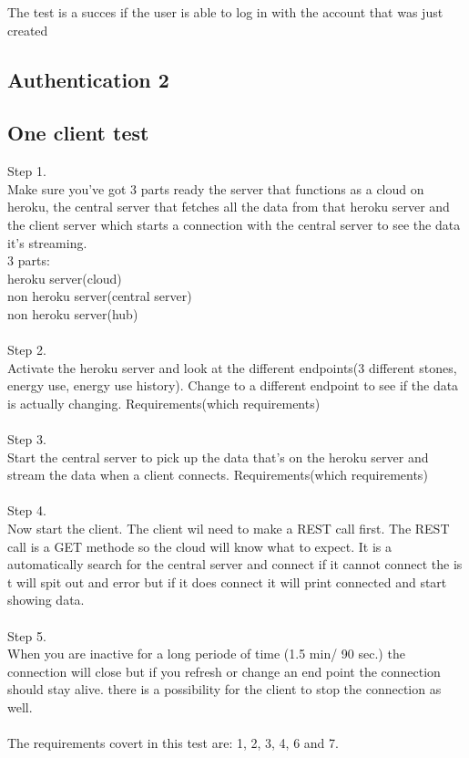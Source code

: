 \documentclass{article}
\begin{document}
The test is a succes if the user is able to log in with the account that was just created
\subsection{Authentication 2}\label{authentication2}


\subsection{One client test}\label{client test}
Step 1. \\
Make sure you've got 3 parts ready the server that functions as a cloud on heroku, the central server that fetches all the data from that heroku server and the client server which starts a connection with the central server to see the data it's streaming. \\
3 parts: \\
heroku server(cloud)\\
non heroku server(central server)\\
non heroku server(hub)\\
\\
Step 2.\\
Activate the heroku server and look at the different endpoints(3 different stones, energy use, energy use history). Change to a different endpoint to see if the data is actually changing. Requirements(which requirements)\\
\\
Step 3.\\
Start the central server to pick up the data that's on the heroku server and stream the data when a client connects. Requirements(which requirements)\\
\\
Step 4. \\
Now start the client. The client wil need to make a REST call first. The REST call is a GET methode so the cloud will know what to expect. It is a automatically search for the central server and connect if it cannot connect the is t will spit out and error but if it does connect it will print connected and start showing data.\\
\\
Step 5. \\
When you are inactive for a long periode of time (1.5 min/ 90 sec.) the connection will close but if you refresh or change an end point the connection should stay alive. there is a possibility for the client to stop the connection as well. \\
\\
The requirements covert in this test are: 
1, 2, 3, 4, 6 and 7.
\end{document}
